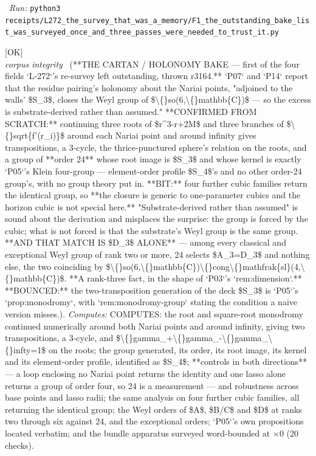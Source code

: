 \begin{description}
\ \emph{Run:} \texttt{python3 receipts/L272\_the\_survey\_that\_was\_a\_memory/F1\_the\_outstanding\_bake\_list\_was\_surveyed\_once\_and\_three\_passes\_were\_needed\_to\_trust\_it.py}
\item[\label{rcpt:C1_the_weyl_closure_is_generic_to_cubics_and_the_match_is_D3_alone}\texttt{C1\_the\_weyl\_closure\_is\_generic\_to\_cubics\_and\_the\_match\_is\_D3\_alone}]\hfill\textsf{[OK]}\\
\textit{corpus integrity} \ (**THE CARTAN / HOLONOMY BAKE --- first of the four fields `L-272`'s re-survey left outstanding, thrown r3164.** `P07` and `P14` report that the residue pairing's holonomy about the Nariai points, "adjoined to the walls' \$S\_3\$, closes the Weyl group of \$\textbackslash\{\}so(6,\textbackslash\{\}mathbb\{C\})\$ --- so the excess is substrate-derived rather than assumed." **CONFIRMED FROM SCRATCH:** continuing three roots of \$r\textasciicircum{}3-r+2M\$ and three branches of \$\textbackslash\{\}sqrt\{f'(r\_i)\}\$ around each Nariai point and around infinity gives transpositions, a 3-cycle, the thrice-punctured sphere's relation on the roots, and a group of **order 24** whose root image is \$S\_3\$ and whose kernel is exactly `P05`'s Klein four-group --- element-order profile \$S\_4\$'s and no other order-24 group's, with no group theory put in. **BIT:** four further cubic families return the identical group, so **the closure is generic to one-parameter cubics and the horizon cubic is not special here.** "Substrate-derived rather than assumed" is sound about the derivation and misplaces the surprise: the group is forced by the cubic; what is not forced is that the substrate's Weyl group is the same group. **AND THAT MATCH IS \$D\_3\$ ALONE** --- among every classical and exceptional Weyl group of rank two or more, 24 selects \$A\_3=D\_3\$ and nothing else, the two coinciding by \$\textbackslash\{\}so(6,\textbackslash\{\}mathbb\{C\})\textbackslash\{\}cong\textbackslash\{\}mathfrak\{sl\}(4,\textbackslash\{\}mathbb\{C\})\$. **A rank-three fact, in the shape of `P03`'s `rem:dimension`.** **BOUNCED:** the two-transposition generation of the deck \$S\_3\$ is `P05`'s `prop:monodromy`, with `rem:monodromy-group` stating the condition a naive version misses.). 
\emph{Computes:} COMPUTES: the root and square-root monodromy continued numerically around both Nariai points and around infinity, giving two transpositions, a 3-cycle, and \$\textbackslash\{\}gamma\_+\textbackslash\{\}gamma\_-\textbackslash\{\}gamma\_\textbackslash\{\}infty=1\$ on the roots; the group generated, its order, its root image, its kernel and its element-order profile, identified as \$S\_4\$; **controls in both directions** --- a loop enclosing no Nariai point returns the identity and one lasso alone returns a group of order four, so 24 is a measurement --- and robustness across base points and lasso radii; the same analysis on four further cubic families, all returning the identical group; the Weyl orders of \$A\$, \$B/C\$ and \$D\$ at ranks two through six against 24, and the exceptional orders; `P05`'s own propositions located verbatim; and the bundle apparatus surveyed word-bounded at \ensuremath{\times}0 (20 checks).

\end{description}
